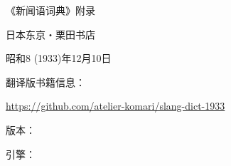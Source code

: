 
\maketitle



《新闻语词典》附录

日本东京・栗田书店

昭和8 (1933)年12月10日

\vspace*{\fill}

翻译版书籍信息：

\url{https://github.com/atelier-komari/slang-dict-1933}

版本：\gitversion

引擎：\luatexbanner

\clearpage
